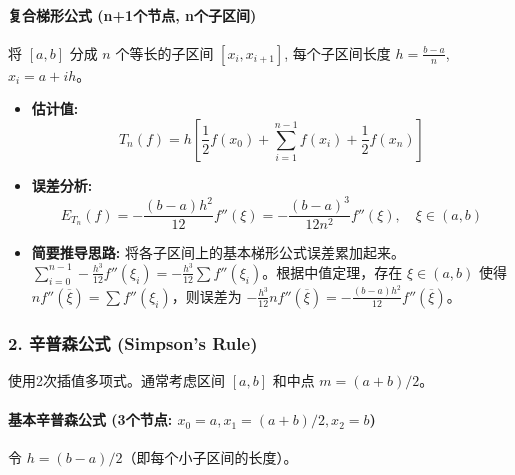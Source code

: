 \paragraph{复合梯形公式 (n+1个节点, n个子区间)}

将 $[a,b]$ 分成 $n$ 个等长的子区间 $[x_i, x_{i+1}]$, 每个子区间长度 $h = \frac{b-a}{n}$,$x_i = a+ih$。

\begin{itemize}
	\item \textbf{估计值:}
\[
T_n(f) = h \left[ \frac{1}{2}f(x_0) + \sum_{i=1}^{n-1} f(x_i) + \frac{1}{2}f(x_n) \right]
\]	\item \textbf{误差分析:}
\[
E_{T_n}(f) = -\frac{(b-a)h^2}{12} f''(\xi) = -\frac{(b-a)^3}{12n^2} f''(\xi), \quad \xi \in (a,b)
\]	\item \textbf{简要推导思路:}
将各子区间上的基本梯形公式误差累加起来。$\sum_{i=0}^{n-1} -\frac{h^3}{12} f''(\xi_i) = -\frac{h^3}{12} \sum f''(\xi_i)$。根据中值定理，存在 $\xi \in (a,b)$ 使得 $n f''(\overline{\xi}) = \sum f''(\xi_i)$，则误差为 $-\frac{h^3}{12} n f''(\overline{\xi}) = -\frac{(b-a)h^2}{12}f''(\overline{\xi})$。
\end{itemize}

\subsubsection{2. 辛普森公式 (Simpson's Rule)}

使用2次插值多项式。通常考虑区间 $[a,b]$ 和中点 $m=(a+b)/2$。

\paragraph{基本辛普森公式 (3个节点: \texorpdfstring{$x_0=a, x_1=(a+b)/2, x_2=b$}{x_0=a, x_1=(a+b)/2, x_2=b})}

令 $h = (b-a)/2$（即每个小子区间的长度）。

